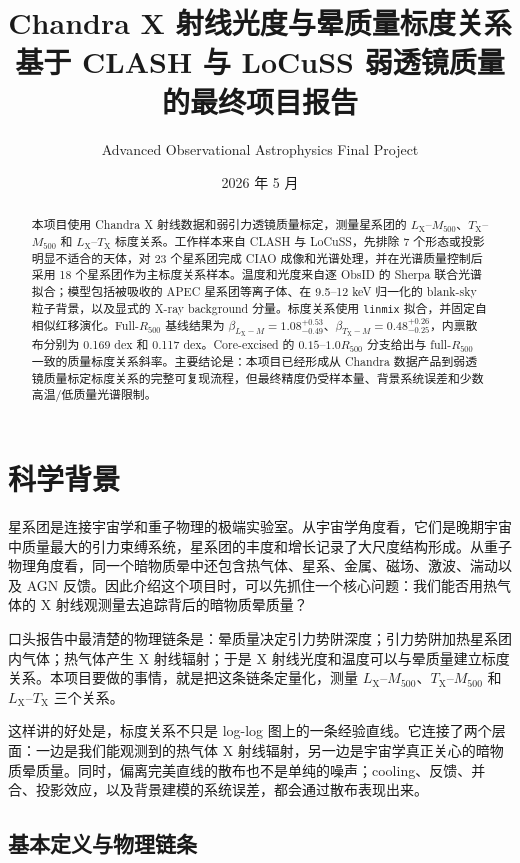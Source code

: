 \documentclass[UTF8,11pt,fontset=none]{ctexart}
\title{\textbf{Chandra X 射线光度与晕质量标度关系}\\
\large 基于 CLASH 与 LoCuSS 弱透镜质量的最终项目报告}
\author{Advanced Observational Astrophysics Final Project}
\date{2026 年 5 月}
\newcommand{\Mfive}{\ensuremath{M_{500}}}
\newcommand{\Rfive}{\ensuremath{R_{500}}}
\newcommand{\Lx}{\ensuremath{L_{\mathrm{X}}}}
\newcommand{\Tx}{\ensuremath{T_{\mathrm{X}}}}
\begin{document}
\maketitle

\begin{abstract}
本项目使用 Chandra X 射线数据和弱引力透镜质量标定，测量星系团的 $L_{\mathrm{X}}$--$M_{500}$、$T_{\mathrm{X}}$--$M_{500}$ 和 $L_{\mathrm{X}}$--$T_{\mathrm{X}}$ 标度关系。工作样本来自 CLASH 与 LoCuSS，先排除 7 个形态或投影明显不适合的天体，对 23 个星系团完成 CIAO 成像和光谱处理，并在光谱质量控制后采用 18 个星系团作为主标度关系样本。温度和光度来自逐 ObsID 的 Sherpa 联合光谱拟合；模型包括被吸收的 APEC 星系团等离子体、在 9.5--12 keV 归一化的 blank-sky 粒子背景，以及显式的 X-ray background 分量。标度关系使用 \texttt{linmix} 拟合，并固定自相似红移演化。Full-\Rfive{} 基线结果为 $\beta_{\Lx-M}=1.08^{+0.53}_{-0.49}$、$\beta_{\Tx-M}=0.48^{+0.26}_{-0.25}$，内禀散布分别为 0.169 dex 和 0.117 dex。Core-excised 的 $0.15$--$1.0\Rfive$ 分支给出与 full-\Rfive{} 一致的质量标度关系斜率。主要结论是：本项目已经形成从 Chandra 数据产品到弱透镜质量标定标度关系的完整可复现流程，但最终精度仍受样本量、背景系统误差和少数高温/低质量光谱限制。
\end{abstract}

\section{科学背景}

星系团是连接宇宙学和重子物理的极端实验室。从宇宙学角度看，它们是晚期宇宙中质量最大的引力束缚系统，星系团的丰度和增长记录了大尺度结构形成。从重子物理角度看，同一个暗物质晕中还包含热气体、星系、金属、磁场、激波、湍动以及 AGN 反馈。因此介绍这个项目时，可以先抓住一个核心问题：我们能否用热气体的 X 射线观测量去追踪背后的暗物质晕质量？

口头报告中最清楚的物理链条是：晕质量决定引力势阱深度；引力势阱加热星系团内气体；热气体产生 X 射线辐射；于是 X 射线光度和温度可以与晕质量建立标度关系。本项目要做的事情，就是把这条链条定量化，测量 \Lx--\Mfive{}、\Tx--\Mfive{} 和 \Lx--\Tx{} 三个关系。

这样讲的好处是，标度关系不只是 log-log 图上的一条经验直线。它连接了两个层面：一边是我们能观测到的热气体 X 射线辐射，另一边是宇宙学真正关心的暗物质晕质量。同时，偏离完美直线的散布也不是单纯的噪声；cooling、反馈、并合、投影效应，以及背景建模的系统误差，都会通过散布表现出来。

\subsection{基本定义与物理链条}
\end{document}

